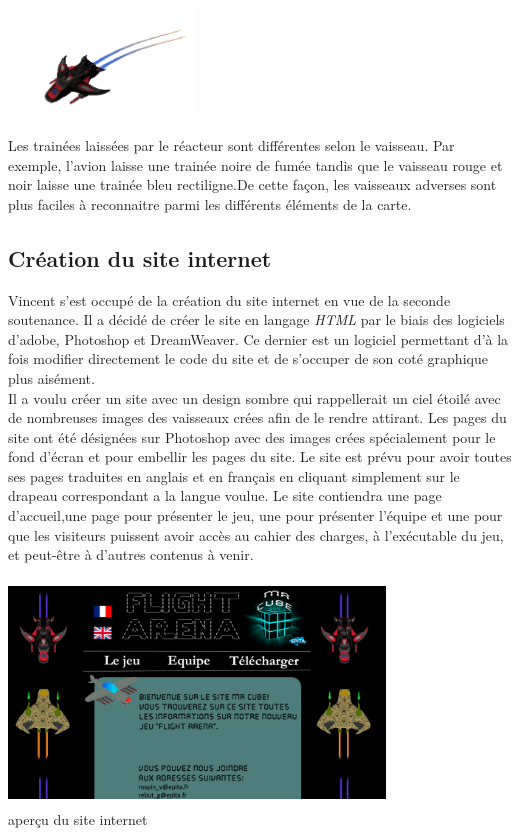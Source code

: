 \documentclass[10pt, titlepage]{report}
\begin{document}
\begin{center}
\includegraphics[height=3cm, width=5cm]{vaisseau_bouge.png}
\end{center}

Les trainées laissées par le réacteur sont différentes selon le vaisseau. Par exemple, l'avion laisse une trainée noire de fumée tandis que le vaisseau rouge et noir laisse une trainée bleu rectiligne.De cette façon, les vaisseaux adverses sont plus faciles à reconnaitre parmi les différents éléments de la carte. \\

\subsection{Création du site internet}
Vincent s'est occupé de la création du site internet en vue de la seconde soutenance. Il a décidé de créer le site en langage \textit{HTML} par le biais des logiciels d'adobe, Photoshop et DreamWeaver. Ce dernier est un logiciel permettant d'à la fois modifier directement le code du site et de s'occuper de son coté graphique plus aisément.\\

Il a voulu créer un site avec un design sombre qui rappellerait un ciel étoilé avec de nombreuses images des vaisseaux crées afin de le rendre attirant. Les pages du site ont été désignées sur Photoshop avec des images crées spécialement pour le fond d'écran et pour embellir les pages du site. Le site est prévu pour avoir toutes ses pages traduites en anglais et en français en cliquant simplement sur le drapeau correspondant a la langue voulue. Le site contiendra une page d'accueil,une page pour présenter le jeu, une pour présenter l'équipe et une pour que les visiteurs puissent avoir accès au cahier des charges, à l'exécutable du jeu, et peut-être à d'autres contenus à venir.\\

\begin{center}
\includegraphics[height=6cm, width=10cm]{site.png}\\
aperçu du site internet
\end{center}
\end{document}
